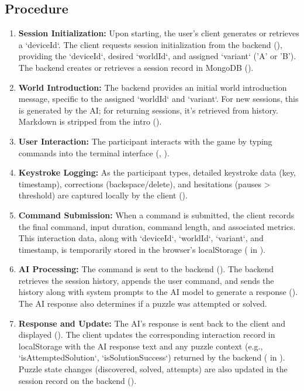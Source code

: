 \documentclass{article}
\begin{document}
\subsection{Procedure}
\begin{enumerate}
    \item \textbf{Session Initialization:} Upon starting, the user's client generates or retrieves a `deviceId`. The client requests session initialization from the backend (), providing the `deviceId`, desired `worldId`, and assigned `variant` ('A' or 'B'). The backend creates or retrieves a session record in MongoDB ().
    \item \textbf{World Introduction:} The backend provides an initial world introduction message, specific to the assigned `worldId` and `variant`. For new sessions, this is generated by the AI; for returning sessions, it's retrieved from history. Markdown is stripped from the intro ().
    \item \textbf{User Interaction:} The participant interacts with the game by typing commands into the terminal interface (, ).
    \item \textbf{Keystroke Logging:} As the participant types, detailed keystroke data (key, timestamp), corrections (backspace/delete), and hesitations (pauses > threshold) are captured locally by the client ().
    \item \textbf{Command Submission:} When a command is submitted, the client records the final command, input duration, command length, and associated metrics. This interaction data, along with `deviceId`, `worldId`, `variant`, and timestamp, is temporarily stored in the browser's localStorage ( in ).
    \item \textbf{AI Processing:} The command is sent to the backend (). The backend retrieves the session history, appends the user command, and sends the history along with system prompts to the AI model to generate a response (). The AI response also determines if a puzzle was attempted or solved.
    \item \textbf{Response and Update:} The AI's response is sent back to the client and displayed (). The client updates the corresponding interaction record in localStorage with the AI response text and any puzzle context (e.g., `isAttemptedSolution`, `isSolutionSuccess`) returned by the backend ( in ). Puzzle state changes (discovered, solved, attempts) are also updated in the session record on the backend ().

\end{enumerate}
\end{document}
